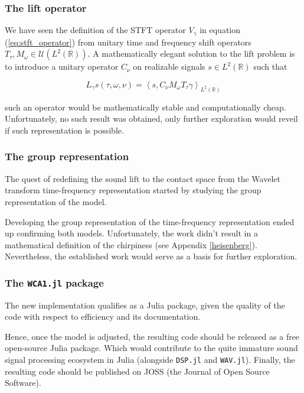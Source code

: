 \documentclass[american,]{article}
\theoremstyle{definition}
\theoremstyle{definition}
\theoremstyle{definition}
\theoremstyle{remark}
\begin{document}
\hypertarget{the-lift-operator}{%
\subsubsection{The lift operator}\label{the-lift-operator}}

We have seen the definition of the STFT operator \(V_\gamma\) in equation (\ref{eq:stft_operator})
from unitary time and frequency shift operators \(T_\tau,M_\omega\in\mathcal{U}(L^2(\mathbb{R}))\).
A mathematically elegant solution to the lift problem is to introduce
a unitary operator \(C_\nu\) on realizable signals \(s\in L^2(\mathbb{R})\) such that

\begin{equation}
L_\gamma s(\tau,\omega,\nu) = \left\langle s,C_\nu M_\omega T_\tau \gamma\right\rangle_{L^2(\mathbb{R})}
\end{equation}

such an operator would be mathematically stable and computationally cheap.
Unfortunately, no such result was obtained, only further exploration
would reveil if such representation is possible.

\hypertarget{the-group-representation}{%
\subsubsection{The group representation}\label{the-group-representation}}

The quest of redefining the sound lift to the contact space from the Wavelet
transform time-frequency representation started by studying the group representation of the model.

Developing the group representation of the time-frequency representation ended up
confirming both models.
Unfortunately, the work didn't result in a mathematical definition of the chirpiness
(see Appendix \ref{heisenberg}).
Nevertheless, the established work would serve as a basis for further exploration.

\hypertarget{the-wca1.jl-package}{%
\subsubsection{\texorpdfstring{The \texttt{WCA1.jl} package}{The WCA1.jl package}}\label{the-wca1.jl-package}}

The new implementation qualifies as a Julia package,
given the quality of the code with respect to efficiency and its documentation.

Hence, once the model is adjusted, the resulting code should be released
as a free open-source Julia package.
Which would contribute to the quite immature sound signal processing ecosystem
in Julia (alongside \texttt{DSP.jl} and \texttt{WAV.jl}).
Finally, the resulting code should be published on JOSS (the Journal of Open Source Software).
\end{document}
